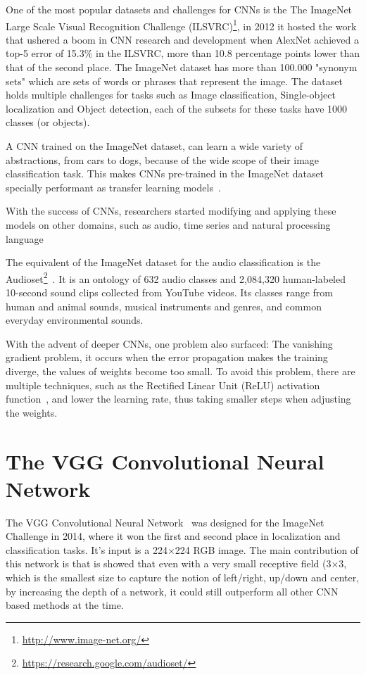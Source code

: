 One of the most popular datasets and challenges for CNNs is the The ImageNet Large Scale Visual Recognition Challenge (ILSVRC)\footnote{\url{http://www.image-net.org/}}\cite{deng2009imagenet}, in 2012 it hosted the work that ushered a boom in CNN research and development when AlexNet achieved a top-5 error of 15.3\% in the ILSVRC, more than 10.8 percentage points lower than that of the second place. The ImageNet dataset has more than 100.000 "synonym sets" which are sets of words or phrases that represent the image. The dataset holds multiple challenges for tasks such as Image classification, Single-object localization and Object detection, each of the subsets for these tasks have 1000 classes (or objects).

A CNN trained on the ImageNet dataset, can learn a wide variety of abstractions, from cars to dogs, because of the wide scope of their image classification task. This makes CNNs pre-trained in the ImageNet dataset specially performant as transfer learning models~\cite{huh2016makes}.

With the success of CNNs, researchers started modifying and applying these models on other domains, such as audio, time series and natural processing language

The equivalent of the ImageNet dataset for the audio classification is the Audioset\footnote{\url{https://research.google.com/audioset/}}~\cite{gemmeke2017audioset}. It is an ontology of 632 audio classes and 2,084,320 human-labeled 10-second sound clips collected from YouTube videos. Its classes range from human and animal sounds, musical instruments and genres, and common everyday environmental sounds.

With the advent of deeper CNNs, one problem also surfaced: The vanishing gradient problem, it occurs when the error propagation makes the training diverge, the values of weights become too small. To avoid this problem, there are multiple techniques, such as the Rectified Linear Unit (ReLU) activation function~\cite{krizhevsky2012relu}, and lower the learning rate, thus taking smaller steps when adjusting the weights.

\section{The VGG Convolutional Neural Network}\label{sec:VGGish}

The VGG Convolutional Neural Network~\cite{simonyan2014VGG} was designed for the ImageNet Challenge in 2014, where it won the first and second place in localization and classification tasks. It's input is a 224$\times$224 RGB image. The main contribution of this network is that is showed that even with a very small receptive field (3$\times$3, which is the smallest size to capture the notion of left/right, up/down and center, by increasing the depth of a network, it could still outperform all other CNN based methods at the time.

